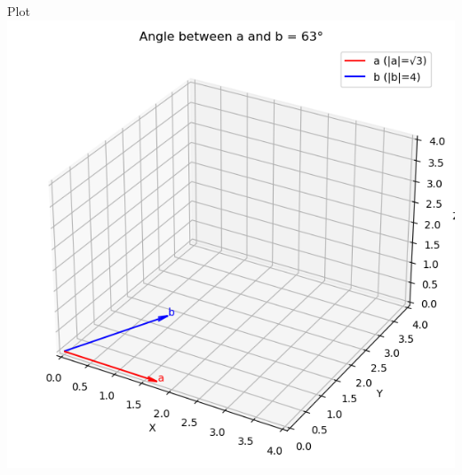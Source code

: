 \documentclass{beamer}
\begin{document}
\begin{frame}{Plot}
    \centering
    \includegraphics[width=\columnwidth, height=0.8\textheight, keepaspectratio]{Beamer/figs/fig3.png}     
\end{frame}
\end{document}
